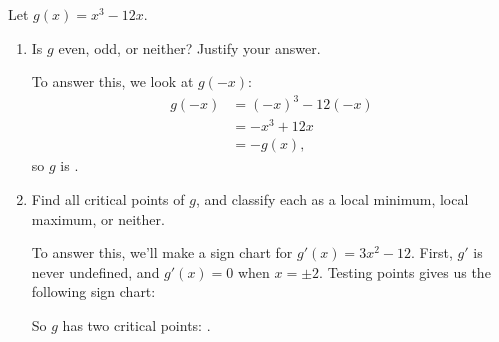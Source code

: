\documentclass{article}
\begin{document}
\begin{enumerate}
  Let $g(x) = x^3 - 12x$. 

  \begin{enumerate}

  \item
    \begin{problem}[\stretch{0.4}]
      Is $g$ even, odd, or neither? Justify your answer. 
    \end{problem}

    \begin{solution}
      To answer this, we look at $g(-x)$:
      \begin{align*}
        g(-x) &= (-x)^3 - 12 (-x) \\
        &= - x^3 + 12 x \\
        &= - g(x),
      \end{align*}
      so $g$ is . 
    \end{solution}

  \item
    \begin{problem}[\vfill]
      Find all critical points of $g$, and classify each as a local minimum, local maximum, or neither. 
    \end{problem}

    \begin{solution} 
      To answer this, we'll make a sign chart for $g'(x) = 3x^2 - 12$. First, $g'$ is never undefined, and $g'(x) = 0$ when $x = \pm 2$. Testing points gives us the following sign chart:
      \begin{center}
      \end{center}
      So $g$ has two critical points: .
    \end{solution}


\end{enumerate}
\end{enumerate}
\end{document}
